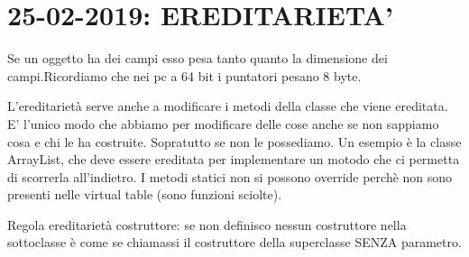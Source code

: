 

\newpage
\section{25-02-2019: EREDITARIETA'}
Se un oggetto ha dei campi esso pesa tanto quanto la dimensione dei campi.Ricordiamo che nei pc a 64 bit i puntatori pesano 8 byte.

\noindent L'ereditarietà serve anche a modificare i metodi della classe che viene ereditata. E' l'unico modo che abbiamo per modificare delle cose anche se non sappiamo cosa e chi le ha costruite. Sopratutto se non le possediamo. Un esempio è la classe ArrayList, che deve essere ereditata per implementare un motodo che ci permetta di scorrerla all'indietro. \newline
I metodi statici non si possono override perchè non sono presenti nelle virtual table (sono funzioni sciolte). \newline

Regola ereditarietà costruttore: se non definisco nessun costruttore nella sottoclasse è come se chiamassi il costruttore della superclasse SENZA parametro. 






